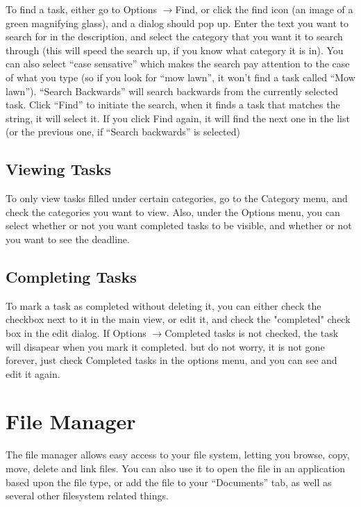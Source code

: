 \documentclass[12pt,letterpaper,oneside, openany]{book} \usepackage[latin1] {inputenc}
\begin{document}
To find a task, either go to Options \begin{math}\rightarrow\end{math}Find, or click the find icon (an image of a green magnifying glass), and a dialog should pop up. Enter the text you want to search for in the description, and select the category that you want it to search through (this will speed the search up, if you know what category it is in). You can also select ``case sensative'' which makes the search pay attention to the case of what you type (so if you look for ``mow lawn'', it won't find a task called ``Mow lawn''). ``Search Backwards'' will search backwards from the currently selected task. Click ``Find'' to initiate the search, when it finds a task that matches the string, it will select it. If you click Find again, it will find the next one in the list (or the previous one, if ``Search backwards'' is selected) 

\section{Viewing Tasks}

To only view tasks filled under certain categories, go to the Category menu, and check the categories you want to view. Also, under the Options menu, you can select whether or not you want completed tasks to be visible, and whether or not you want to see the deadline. 

\section{Completing Tasks}

To mark a task as completed without deleting it, you can either check the checkbox next to it in the main view, or edit it, and check the "completed" check box in the edit dialog. If Options \begin{math}\rightarrow\end{math}Completed tasks is not checked, the task will disapear when you mark it completed. but do not worry, it is not gone forever, just check Completed tasks in the options menu, and you can see and edit it again.

\chapter{File Manager}
The file manager allows easy access to your file system, letting you browse, copy, move, delete and link files.  You can also use it to open the file in an application based upon the file type, or add the file to your ``Documents'' tab, as well as several other filesystem related things.
\end{document}
